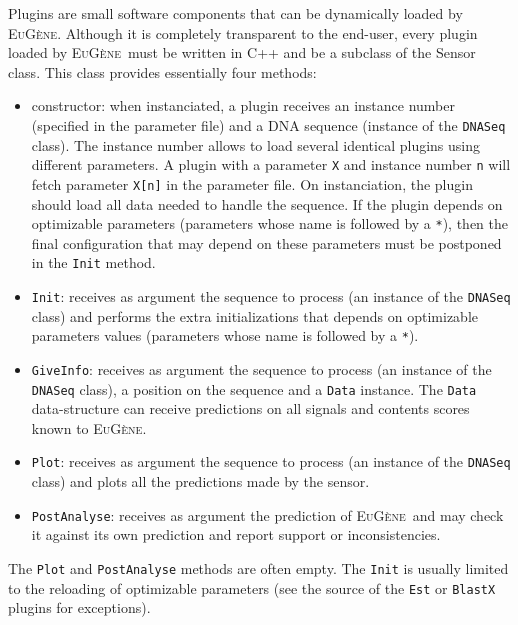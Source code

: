 \documentclass[a4paper,titlepage]{report}
\newcommand{\EuGene}{\textsc{EuG\`ene}}
\begin{document}
Plugins are small software components that can be dynamically loaded
by \EuGene. Although it is completely transparent to the end-user,
every plugin loaded by \EuGene\ must be written in C++ and be a
subclass of the Sensor class. This class provides essentially four
methods:
\begin{itemize}
\item constructor: when instanciated, a plugin receives an instance number
  (specified in the parameter file) and a DNA sequence (instance of
  the \texttt{DNASeq} class). The instance number allows to load
  several identical plugins using different parameters. A plugin with
  a parameter \texttt{X} and instance number \texttt{n} will fetch
  parameter \texttt{X[n]} in the parameter file. On instanciation, the
  plugin should load all data needed to handle the sequence. If the
  plugin depends on optimizable parameters (parameters whose name is
  followed by a \texttt{*}), then the final configuration that may
  depend on these parameters must be postponed in the \texttt{Init}
  method. 
  
\item \texttt{Init}: receives as argument the sequence to process (an
  instance of the \texttt{DNASeq} class) and performs the extra
  initializations that depends on optimizable parameters values
  (parameters whose name is followed by a \texttt{*}).
  
\item \texttt{GiveInfo}: receives as argument the sequence to process
  (an instance of the \texttt{DNASeq} class), a position on the
  sequence and a \texttt{Data} instance. The \texttt{Data}
  data-structure can receive predictions on all signals and contents
  scores known to \EuGene.

\item \texttt{Plot}: receives as argument the sequence to process (an
  instance of the \texttt{DNASeq} class) and plots all the predictions
  made by the sensor.

\item \texttt{PostAnalyse}: receives as argument the prediction of
  \EuGene\ and may check it against its own prediction and report
  support or inconsistencies.
\end{itemize}

The \texttt{Plot} and \texttt{PostAnalyse} methods are often empty.
The \texttt{Init} is usually limited to the reloading of optimizable
parameters (see the source of the \texttt{Est} or \texttt{BlastX}
plugins for exceptions).
\end{document}
